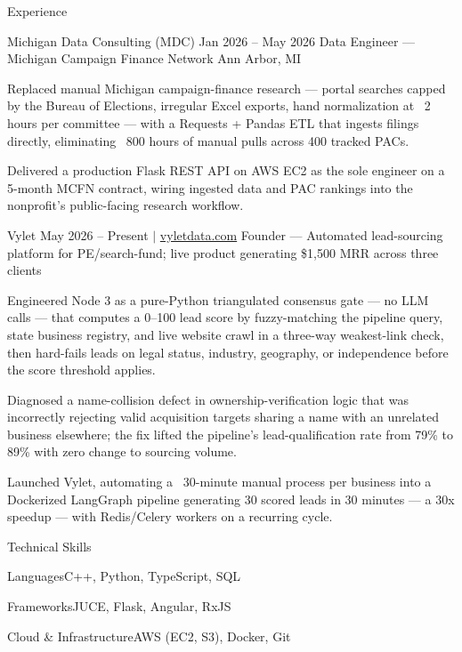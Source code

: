 \documentclass[
	11pt
]{../../../template}
\begin{document}
\begin{rSection}{E}{xperience}
		\begin{rSectionEntry}
			{Michigan Data Consulting (MDC)}
			{Jan 2026 -- May 2026}
			{Data Engineer --- Michigan Campaign Finance Network}
			{}
			{Ann Arbor, MI}

			\item Replaced manual Michigan campaign-finance research --- portal searches capped by the Bureau of Elections, irregular Excel exports, hand normalization at ~2 hours per committee --- with a Requests + Pandas ETL that ingests filings directly, eliminating ~800 hours of manual pulls across 400 tracked PACs.
			\item Delivered a production Flask REST API on AWS EC2 as the sole engineer on a 5-month MCFN contract, wiring ingested data and PAC rankings into the nonprofit's public-facing research workflow.
		\end{rSectionEntry}

		\begin{rSectionEntry}
			{Vylet}
			{May 2026 -- Present $\vert$ \href{https://vyletdata.com}{vyletdata.com}}
			{Founder --- Automated lead-sourcing platform for PE/search-fund; live product generating \$1,500 MRR across three clients}
			{}
			{}

			\item Engineered Node 3 as a pure-Python triangulated consensus gate --- no LLM calls --- that computes a 0--100 lead score by fuzzy-matching the pipeline query, state business registry, and live website crawl in a three-way weakest-link check, then hard-fails leads on legal status, industry, geography, or independence before the score threshold applies.
			\item Diagnosed a name-collision defect in ownership-verification logic that was incorrectly rejecting valid acquisition targets sharing a name with an unrelated business elsewhere; the fix lifted the pipeline's lead-qualification rate from 79\% to 89\% with zero change to sourcing volume.
			\item Launched Vylet, automating a ~30-minute manual process per business into a Dockerized LangGraph pipeline generating 30 scored leads in 30 minutes --- a 30x speedup --- with Redis/Celery workers on a recurring cycle.
		\end{rSectionEntry}
	\end{rSection}

	\begin{rSection}{T}{echnical Skills}
		\begin{rSet}{Languages}{C++, Python, TypeScript, SQL}
		\end{rSet}
		\begin{rSet}{Frameworks}{JUCE, Flask, Angular, RxJS}
		\end{rSet}
		\begin{rSet}{Cloud \& Infrastructure}{AWS (EC2, S3), Docker, Git}
		\end{rSet}
	\end{rSection}
\end{document}

